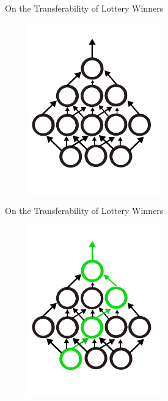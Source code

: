 \documentclass{beamer}
\begin{document}
\begin{frame}{On the Transferability of Lottery Winners}

	\begin{figure}
		\includegraphics[width=0.5\textwidth]{figures/mlp.pdf}
	\end{figure}

\end{frame}

\begin{frame}{On the Transferability of Lottery Winners}

	\begin{figure}
		\includegraphics[width=0.5\textwidth]{figures/mlp_ticket_3.pdf}
	\end{figure}

\end{frame}
\end{document}
